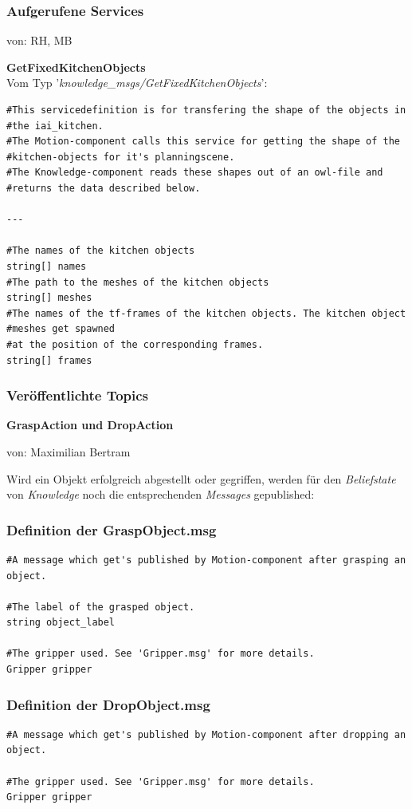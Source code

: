 \documentclass{suturo}
\makeatletter
\newcommand{\chapterauthor}[1]{%
  {\parindent0pt\vspace*{-27pt}%
  \linespread{0}\small\begin{flushright}von: #1\end{flushright}%
  \par\nobreak\vspace*{0pt}}
  \@afterheading%
}
\makeatother
\begin{document}
\subsubsection{Aufgerufene Services}
\chapterauthor{RH, MB}
\textbf{GetFixedKitchenObjects}\\
Vom Typ '\textit{knowledge\_msgs/GetFixedKitchenObjects}': \\ 
\begin{verbatim}
#This servicedefinition is for transfering the shape of the objects in
#the iai_kitchen.
#The Motion-component calls this service for getting the shape of the 
#kitchen-objects for it's planningscene.
#The Knowledge-component reads these shapes out of an owl-file and 
#returns the data described below.

---

#The names of the kitchen objects
string[] names
#The path to the meshes of the kitchen objects
string[] meshes
#The names of the tf-frames of the kitchen objects. The kitchen object 
#meshes get spawned
#at the position of the corresponding frames.
string[] frames
\end{verbatim}

\subsubsection{Veröffentlichte Topics}
\textbf{GraspAction und DropAction}
\chapterauthor{Maximilian Bertram}

Wird ein Objekt erfolgreich abgestellt oder gegriffen, werden für den \textit{Beliefstate} von \textit{Knowledge} noch die entsprechenden \textit{Messages} gepublished: \\

\subsubsection*{Definition der GraspObject.msg}
\begin{verbatim}
#A message which get's published by Motion-component after grasping an object.

#The label of the grasped object.
string object_label

#The gripper used. See 'Gripper.msg' for more details.
Gripper gripper
\end{verbatim}

\subsubsection*{Definition der DropObject.msg}
\begin{verbatim}
#A message which get's published by Motion-component after dropping an object.

#The gripper used. See 'Gripper.msg' for more details.
Gripper gripper
\end{verbatim}
\end{document}
